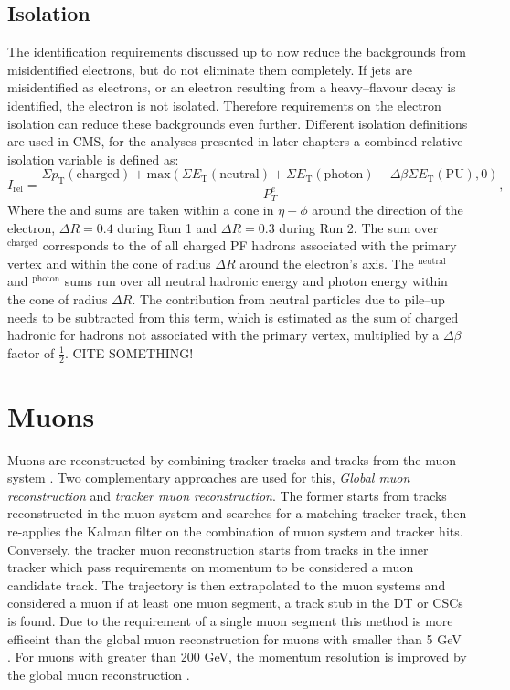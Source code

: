 \subsection{Isolation}
\label{sec:objects_ele_iso}
The identification requirements discussed up to now reduce the backgrounds 
from misidentified electrons, but do not eliminate them completely. If jets are
misidentified as electrons, or an electron resulting from a heavy--flavour 
decay is identified, the electron is not isolated. Therefore requirements
on the electron isolation can reduce these backgrounds even further.
Different isolation definitions are used in \ac{CMS}, for the analyses presented
in later chapters a combined relative isolation variable is defined as:
\begin{equation}\label{eqn:electron_reliso}
I_{\text{rel}} = \frac{\Sigma p_{\text{T}}(\text{charged}) + \mathrm{max}(\Sigma E_{\text{T}}(\text{neutral}) + \Sigma E_{\text{T}}(\text{photon}) - \Delta\beta \Sigma E_{\text{T}}(\text{PU}),0)}{P_{T}^{e}},
\end{equation}
Where the \pT and \ET sums are taken within a cone in $\eta - \phi$ around the direction
of the electron, $\Delta R = 0.4$ during Run 1 and $\Delta R = 0.3$ during Run 2.
The sum over \pT$^{\text{charged}}$ corresponds to the \pT of all charged \ac{PF} 
hadrons associated with the primary vertex and within the cone of radius $\Delta R$ around
the electron's axis. The \ET$^{\text{neutral}}$ and \ET$^{\text{photon}}$ sums
run over all neutral hadronic energy and photon energy within the cone of radius $\Delta R$.
The contribution from neutral particles due to pile--up needs to be subtracted from
this term, which is estimated as the sum of charged hadronic \pT for hadrons not associated
with the primary vertex, multiplied by a $\Delta \beta$ factor of $\frac{1}{2}$.
CITE SOMETHING!


\section{Muons}
\label{sec:objects_muo}
Muons are reconstructed by combining tracker tracks and tracks
from the muon system \cite{cms-muon-reco}. Two complementary approaches are used for this,
\textit{Global muon reconstruction} and \textit{tracker muon reconstruction}. The former starts from 
tracks reconstructed in the muon system and searches for a matching
tracker track, then re-applies the Kalman filter on the combination
of muon system and tracker hits. Conversely, the tracker muon reconstruction starts from
tracks in the inner tracker which pass requirements on momentum to be considered
a muon candidate track. The trajectory is then extrapolated to the muon systems and
considered a muon if at least one muon segment, a track stub in the \ac{DT} or \ac{CSCs} is found.
Due to the requirement of a single muon segment this method is more efficeint than the global muon
reconstruction for muons with \pT smaller than 5 GeV \cite{cms-muon-reco}.
For muons with \pT greater than 200 GeV, the momentum resolution is improved
by the global muon reconstruction \cite{cms-muon-cosmics-perf}.

